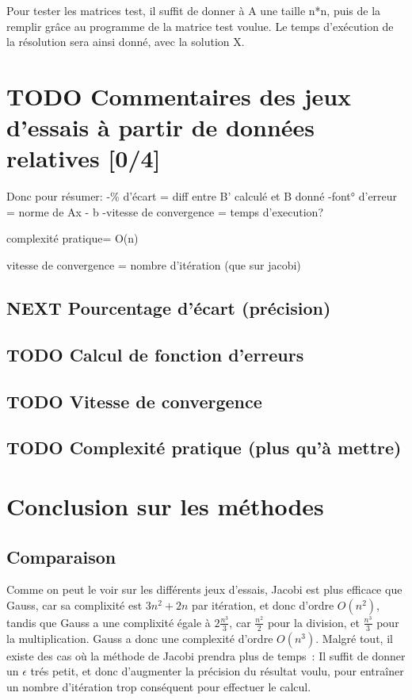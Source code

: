 \documentclass[letter]{article}
\begin{document}
Pour tester les matrices test, il suffit de donner à A une taille n*n, puis de la remplir grâce au programme de la matrice test voulue. Le temps d'exécution de la résolution sera ainsi donné, avec la solution X.







\section{{\bfseries\sffamily TODO} Commentaires des jeux d'essais à partir de données relatives [0/4]}
\label{sec:org53dac62}
Donc pour résumer:
-\% d'écart = diff entre B' calculé et B donné
-font° d'erreur = norme de Ax - b
-vitesse de convergence = temps d'execution?

complexité pratique= O(n)

vitesse de convergence = nombre d'itération (que sur jacobi)


\subsection{{\bfseries\sffamily NEXT} Pourcentage d'écart (précision)}
\label{sec:org4c4637c}

\subsection{{\bfseries\sffamily TODO} Calcul de fonction d'erreurs}
\label{sec:org5ad762f}

\subsection{{\bfseries\sffamily TODO} Vitesse de convergence}
\label{sec:org2805d4e}

\subsection{{\bfseries\sffamily TODO} Complexité pratique (plus qu'à mettre)}
\label{sec:orga036378}


\section{Conclusion sur les méthodes}
\label{sec:org4834877}

\subsection{Comparaison}
\label{sec:org8b212be}
Comme on peut le voir sur les différents jeux d'essais, Jacobi est plus efficace que Gauss, car sa complixité est \(3n^2+2n\) par itération, et donc d'ordre \(O(n^2)\), tandis que Gauss a une complixité égale à \(2\frac{n^3}{3}\), car \(\frac{n^2}{2}\) pour la division, et \(\frac{n^3}{3}\) pour la multiplication.
Gauss a donc une complexité d'ordre \(O(n^3)\).
Malgré tout, il existe des cas où la méthode de Jacobi prendra plus de temps : Il suffit de donner un \(\epsilon\) trés petit, et donc d'augmenter la précision du résultat voulu, pour entraîner un nombre d'itération trop conséquent pour effectuer le calcul.
\end{document}
